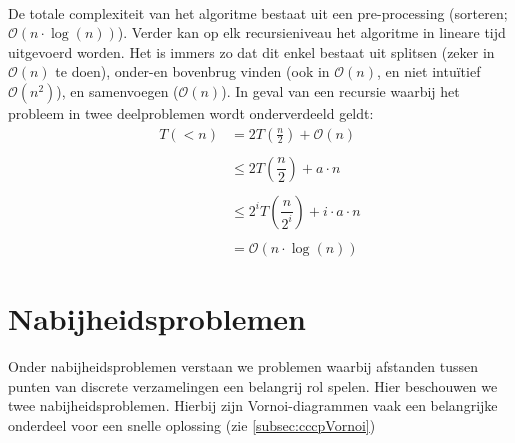 \documentclass[a4paper,titlepage]{article}
\newcommand{\brak}[1]{\left(#1\right)}
\newcommand{\bigoh}[1]{\ensuremath{\mathcal{O}\left(#1\right)}}
\begin{document}
\paragraph{}
De totale complexiteit van het algoritme bestaat uit een pre-processing (sorteren; \bigoh{n\cdot\log\brak{n}}). Verder kan op elk recursieniveau het algoritme in lineare tijd uitgevoerd worden. Het is immers zo dat dit enkel bestaat uit splitsen (zeker in \bigoh{n} te doen), onder-en bovenbrug vinden (ook in \bigoh{n}, en niet intu\"itief \bigoh{n^2}), en samenvoegen (\bigoh{n}). In geval van een recursie waarbij het probleem in twee deelproblemen wordt onderverdeeld geldt:
\begin{equation}
\begin{array}{rl}
T\brak{<n}&=2T\brak{\displaystyle\frac{n}{2}}+\bigoh{n}\\
&\\
&\leq2T\brak{\dfrac{n}{2}}+a\cdot n\\
&\\
&\leq2^iT\brak{\dfrac{n}{2^i}}+i\cdot a\cdot n\\
&\\
&=\bigoh{n\cdot\log\brak{n}}
\end{array}
\end{equation}
\newpage
\section{Nabijheidsproblemen}
Onder nabijheidsproblemen verstaan we problemen waarbij afstanden tussen punten van discrete verzamelingen een belangrij rol spelen. Hier beschouwen we twee nabijheidsproblemen. Hierbij zijn Vornoi-diagrammen vaak een belangrijke onderdeel voor een snelle oplossing (zie \ref{subsec:cccpVornoi})
\end{document}
